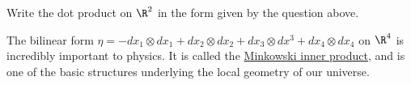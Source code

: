 	\begin{question}
		Write the dot product on $\R^2$ in the form given by the question above.
	\end{question}
	
	\begin{example}
		The bilinear form $\eta = -dx_1 \otimes dx_1 +dx_2 \otimes dx_2 + dx_3\otimes dx^3 + dx_4 \otimes dx_4 $ on $\R^4$ is incredibly important to physics.  
		It is called the \href{http://en.wikipedia.org/wiki/Minkowski_space}{Minkowski inner product}, and is one of the basic structures underlying the local geometry of our 
		universe.
	\end{example}
	


		
	
	
	
	
	
